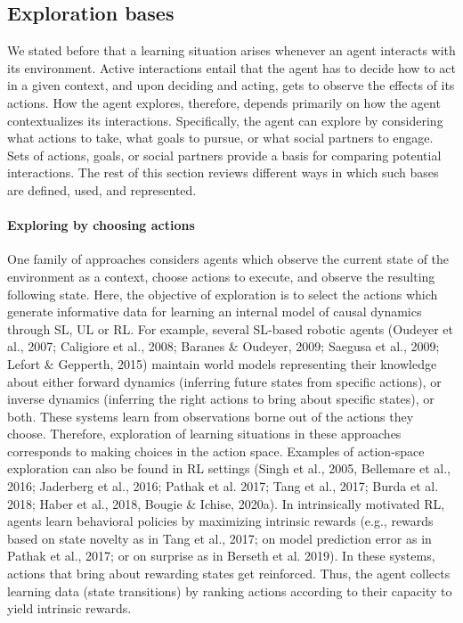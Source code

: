 \subsection{Exploration bases}\label{sec:exploration-bases}
We stated before that a learning situation arises whenever an agent interacts with its environment. Active interactions entail that the agent has to decide how to act in a given context, and upon deciding and acting, gets to observe the effects of its actions. How the agent explores, therefore, depends primarily on how the agent contextualizes its interactions. Specifically, the agent can explore by considering what actions to take, what goals to pursue, or what social partners to engage. Sets of actions, goals, or social partners provide a basis for comparing potential interactions. The rest of this section reviews different ways in which such bases are defined, used, and represented.

\paragraph{Exploring by choosing actions} 
One family of approaches considers agents which observe the current state of the environment as a context, choose actions to execute, and observe the resulting following state. Here, the objective of exploration is to select the actions which generate informative data for learning an internal model of causal dynamics through \ac{SL}, \ac{UL} or \ac{RL}. For example, several \ac{SL}-based robotic agents (Oudeyer et al., 2007; Caligiore et al., 2008; Baranes \& Oudeyer, 2009; Saegusa et al., 2009; Lefort \& Gepperth, 2015) maintain world models representing their knowledge about either forward dynamics (inferring future states from specific actions), or inverse dynamics (inferring the right actions to bring about specific states), or both. These systems learn from observations borne out of the actions they choose. Therefore, exploration of learning situations in these approaches corresponds to making choices in the action space. Examples of action-space exploration can also be found in \ac{RL} settings (Singh et al., 2005, Bellemare et al., 2016; Jaderberg et al., 2016; Pathak et al. 2017; Tang et al., 2017; Burda et al. 2018; Haber et al., 2018, Bougie \& Ichise, 2020a). In intrinsically motivated \ac{RL}, agents learn behavioral policies by maximizing intrinsic rewards (e.g., rewards based on state novelty as in Tang et al., 2017; on model prediction error as in Pathak et al., 2017; or on surprise as in Berseth et al. 2019). In these systems, actions that bring about rewarding states get reinforced. Thus, the agent collects learning data (state transitions) by ranking actions according to their capacity to yield intrinsic rewards. 

